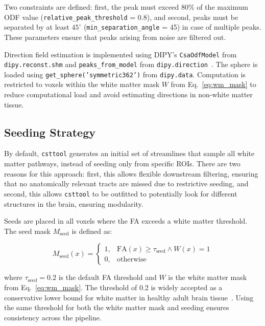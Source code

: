 Two constraints are defined: first, the peak must exceed $80\%$ of the maximum ODF value (\texttt{relative\_peak\_threshold} = 0.8), and second, peaks must be separated by at least $45^{\circ}$ (\texttt{min\_separation\_angle} = 45) in case of multiple peaks. These parameters ensure that peaks arising from noise are filtered out.

Direction field estimation is implemented using DIPY's \texttt{CsaOdfModel} from \texttt{dipy.reconst.\-shm} and \texttt{peaks\_from\_model} from \texttt{dipy.direction}~\cite{garyfallidis_dipy_2014}. The sphere is loaded using \texttt{get\_sphere('symmetric362')} from \texttt{dipy.data}. Computation is restricted to voxels within the white matter mask $W$ from Eq.~\ref{eq:wm_mask} to reduce computational load and avoid estimating directions in non-white matter tissue.

\subsection{Seeding Strategy}
\label{subsec:methods_seeding}

By default, \texttt{csttool} generates an initial set of streamlines that sample all white matter pathways, instead of seeding only from specific ROIs. There are two reasons for this approach: first, this allows flexible downstream filtering, ensuring that no anatomically relevant tracts are missed due to restrictive seeding, and second, this allows \texttt{csttool} to be outfitted to potentially look for different structures in the brain, ensuring modularity.

Seeds are placed in all voxels where the FA exceeds a white matter threshold. The seed mask $M_{\text{seed}}$ is defined as:

\begin{equation}
	M_{\text{seed}}(x) =
	\begin{cases}
		1, & \mathrm{FA}(x) \geq \tau_{\text{seed}} \wedge W(x) = 1 \\
		0, & \text{otherwise}
	\end{cases}
	\label{eq:seed_mask}
\end{equation}

where $\tau_{\text{seed}} = 0.2$ is the default FA threshold and $W$ is the white matter mask from Eq.~\ref{eq:wm_mask}. The threshold of 0.2 is widely accepted as a conservative lower bound for white matter in healthy adult brain tissue~\cite{garyfallidis_dipy_2014}. Using the same threshold for both the white matter mask and seeding ensures consistency across the pipeline.

